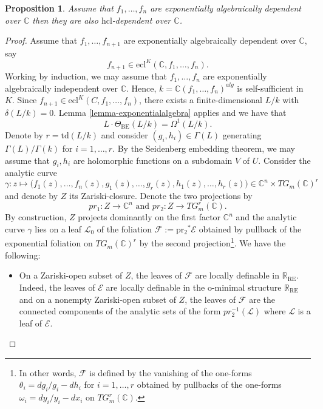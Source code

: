 \documentclass[12pt]{amsart}
\newcommand{\BE}{\mathrm{BE}}
\theoremstyle{definition}
\theoremstyle{plain}
\newtheorem{Prop}[defn]{Proposition}
\theoremstyle{exampstyle}\newtheorem{thmx}{Theorem}
\theoremstyle{exampstyle}\newtheorem{thmxbis}{Theorem}
\begin{document}
\begin{Prop} \label{o-minimal direction2}
Assume that $f_1,\ldots,f_n$ are exponentially algebraically dependent over $\mathbb{C}$ then they are also $\mathrm{hcl}$-dependent over $\mathbb{C}$.
\end{Prop} 

\begin{proof}
Assume that $f_1,\ldots,f_{n+1}$ are exponentially algebraically dependent over $\mathbb{C}$, say $$f_{n+1} \in \mathrm{ecl}^K(\mathbb{C},f_1,\ldots,f_{n}).$$
Working by induction, we may assume that $f_1,\ldots,f_{n}$ are exponentially algebraically independent over $\mathbb{C}$.  Hence, $k = \mathbb{C}(f_1,\ldots,f_{n})^{alg}$ is self-sufficient in $K$. Since $f_{n+1} \in \mathrm{ecl}^K(C,f_1,\ldots,f_{n})$, there exists a finite-dimensional $L/k$ with $\delta(L/k) = 0$. Lemma \ref{lemma-exponentialalgebra} applies and we have that 
\begin{equation} \label{equation}
L \cdot \Theta_{\BE}(L/k)  = \Omega^1(L/k).
\end{equation}
Denote by $r = \mathrm{td}(L/k)$ and consider $(g_i,h_i) \in \Gamma(L)$ generating $\Gamma(L)/\Gamma(k)$ for $i = 1,\ldots, r$. By the Seidenberg embedding theorem, we may assume that $g_i,h_i$ are holomorphic functions on a subdomain $V$ of $U$. Consider the analytic curve 
$$ \gamma: z \mapsto \Big( f_1(z),\ldots,f_{n}(z), g_1(z),\ldots,g_r(z),h_1(z),\ldots, h_r(z)\Big) \in \mathbb{C}^n \times TG_m(\mathbb{C})^r $$
and denote by $Z$ its Zariski-closure. Denote the two projections by 
$$ pr_1 : Z \rightarrow \mathbb{C}^n \text{ and } pr_2 : Z \rightarrow TG_m^r (\mathbb{C}). $$ By construction, $Z$ projects dominantly on the first factor $\mathbb{C}^n$ and the analytic curve $\gamma$ lies on a leaf $\mathcal L_0$ of the foliation $\mathcal F := \mathrm{pr_2}^\ast \mathcal E$
obtained by pullback of the exponential foliation on $TG_m(\mathbb{C})^r$ by the second projection\footnote{In other words, $\mathcal F$ is defined by the vanishing of the one-forms $\theta_i = dg_i/g_i - dh_i$ for $i = 1,\ldots, r$ obtained by pullbacks of the one-forms $\omega_i = dy_i/y_i - dx_i$ on $TG_m^r(\mathbb{C})$.}. We have the following:

\begin{itemize} 
\item [(1)] On a Zariski-open subset of $Z$, the leaves of $\mathcal F$ are locally definable in $\mathbb{R}_{\mathrm{RE}}$. Indeed, the leaves of $\mathcal E$ are locally definable in the o-minimal structure $\mathbb{R}_{\mathrm{RE}}$ and  on a nonempty Zariski-open subset of $Z$, the leaves of $\mathcal F$ are the connected components of the analytic sets of the form $pr_2^{-1}(\mathcal L)$ where $\mathcal L$ is a leaf of $\mathcal E$. 


\end{itemize}
\end{proof}
\end{document}
